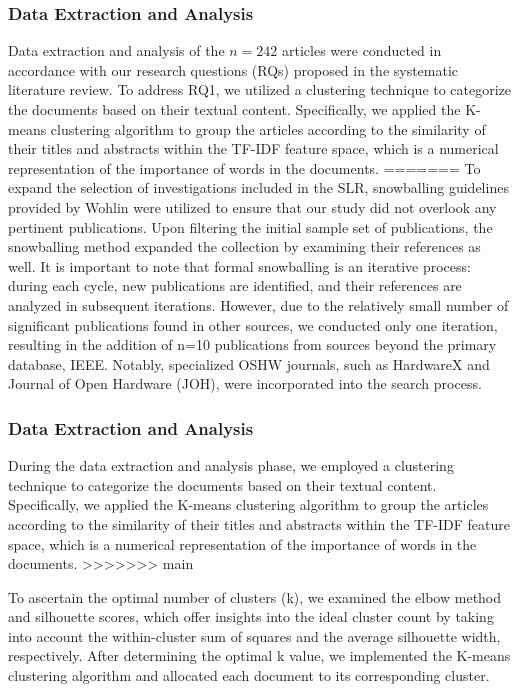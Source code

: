 \documentclass[final-report.tex]{subfiles}
\begin{document}
\subsubsection{Data Extraction and Analysis}
Data extraction and analysis of the $n=242$ articles were conducted in accordance with our research questions (RQs) proposed in the systematic literature review. To address RQ1, we utilized a clustering technique to categorize the documents based on their textual content. Specifically, we applied the K-means clustering algorithm to group the articles according to the similarity of their titles and abstracts within the TF-IDF feature space, which is a numerical representation of the importance of words in the documents.
=======
To expand the selection of investigations included in the SLR, snowballing guidelines provided by Wohlin \cite{wohlin2014guidelines} were utilized to ensure that our study did not overlook any pertinent publications. 
Upon filtering the initial sample set of publications, the snowballing method expanded the collection by examining their references as well. 
It is important to note that formal snowballing is an iterative process: during each cycle, new publications are identified, and their references are analyzed in subsequent iterations. 
However, due to the relatively small number of significant publications found in other sources, we conducted only one iteration, resulting in the addition of n=10 publications from sources beyond the primary database, IEEE. 
Notably, specialized OSHW journals, such as HardwareX and Journal of Open Hardware (JOH), were incorporated into the search process.

\subsubsection{Data Extraction and Analysis}
During the data extraction and analysis phase, we employed a clustering technique to categorize the documents based on their textual content. 
Specifically, we applied the K-means clustering algorithm to group the articles according to the similarity of their titles and abstracts within the TF-IDF feature space, which is a numerical representation of the importance of words in the documents.
>>>>>>> main

To ascertain the optimal number of clusters (k), we examined the elbow method and silhouette scores, which offer insights into the ideal cluster count by taking into account the within-cluster sum of squares and the average silhouette width, respectively. 
After determining the optimal k value, we implemented the K-means clustering algorithm and allocated each document to its corresponding cluster.
\end{document}
